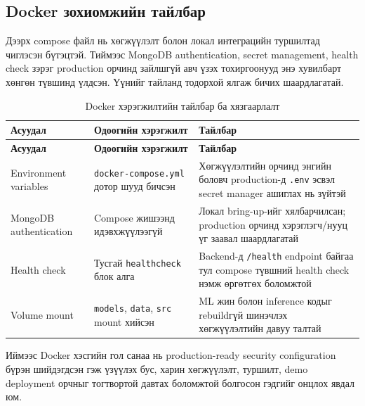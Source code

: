 \subsection{Docker зохиомжийн тайлбар}

Дээрх compose файл нь хөгжүүлэлт болон локал интеграцийн туршилтад чиглэсэн бүтэцтэй. Тиймээс MongoDB authentication, secret management, health check зэрэг production орчинд зайлшгүй авч үзэх тохиргоонууд энэ хувилбарт хөнгөн түвшинд үлдсэн. Үүнийг тайланд тодорхой ялгаж бичих шаардлагатай.

\begin{longtable}{|p{3.4cm}|p{4.1cm}|p{5.1cm}|}
\caption{Docker хэрэгжилтийн тайлбар ба хязгаарлалт}
\label{tab:docker_rationale_limits} \\
\hline
\textbf{Асуудал} & \textbf{Одоогийн хэрэгжилт} & \textbf{Тайлбар} \\
\hline
\endfirsthead
\hline
\textbf{Асуудал} & \textbf{Одоогийн хэрэгжилт} & \textbf{Тайлбар} \\
\hline
\endhead
\hline
\endfoot
Environment variables & \texttt{docker-compose.yml} дотор шууд бичсэн & Хөгжүүлэлтийн орчинд энгийн боловч production-д \texttt{.env} эсвэл secret manager ашиглах нь зүйтэй \\
\hline
MongoDB authentication & Compose жишээнд идэвхжүүлээгүй & Локал bring-up-ийг хялбарчилсан; production орчинд хэрэглэгч/нууц үг заавал шаардлагатай \\
\hline
Health check & Тусгай \texttt{healthcheck} блок алга & Backend-д \texttt{/health} endpoint байгаа тул compose түвшний health check нэмж өргөтгөх боломжтой \\
\hline
Volume mount & \texttt{models}, \texttt{data}, \texttt{src} mount хийсэн & ML жин болон inference кодыг rebuildгүй шинэчлэх хөгжүүлэлтийн давуу талтай \\
\hline
\end{longtable}

Иймээс Docker хэсгийн гол санаа нь production-ready security configuration бүрэн шийдэгдсэн гэж үзүүлэх бус, харин хөгжүүлэлт, туршилт, demo deployment орчныг тогтвортой давтах боломжтой болгосон гэдгийг онцлох явдал юм.
